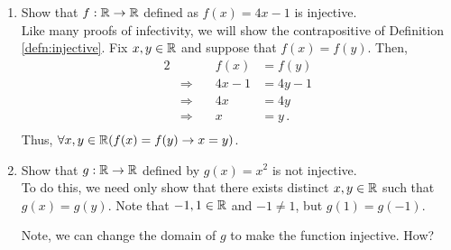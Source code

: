 \guard



\begin{exmp}
\label{exmp:easyInjectiveExamples}
  \begin{enumerate}
    \item Show that $f:\mathbb{R}\to\mathbb{R}$ defined as $f(x) = 4x-1$ is injective.\\
    Like many proofs of infectivity, we will show the contrapositive of Definition \ref{defn:injective}.
    Fix $x,y\in\mathbb{R}$ and suppose that $f(x)=f(y)$.
    Then,
    \begin{alignat*}{2}
      && f(x)&=f(y) \\
      &\Rightarrow\quad& 4x-1 &= 4y-1 \\
      &\Rightarrow\quad& 4x &= 4y \\
      &\Rightarrow\quad& x &= y \,.\\
    \end{alignat*}
    Thus, $\forall x,y\in\mathbb{R}(f(x)=f(y)\rightarrow x=y)$.

    \item Show that $g:\mathbb{R}\to\mathbb{R}$ defined by $g(x)=x^2$ is not injective.\\
    To do this, we need only show that there exists distinct $x,y\in\mathbb{R}$ such that $g(x)=g(y)$.
    Note that $-1,1\in\mathbb{R}$ and $-1\not= 1$, but $g(1)=g(-1)$.

    Note, we can change the domain of $g$ to make the function injective.
    How?
  \end{enumerate}

\end{exmp}
